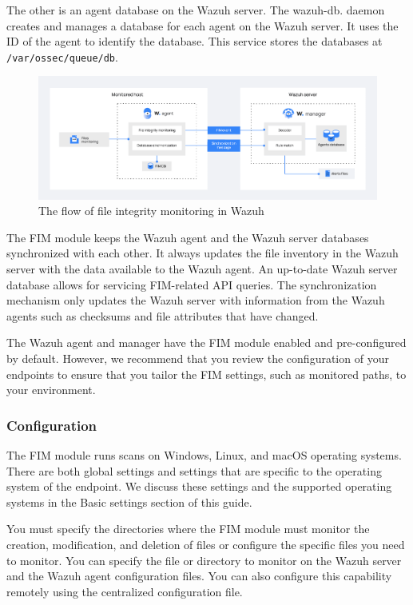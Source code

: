 The other is an agent database on the Wazuh server. The wazuh-db. daemon creates and manages a database for each agent on the Wazuh server. It uses the ID of the agent to identify the database. This service stores the databases at \texttt{/var/ossec/queue/db}.

\begin{figure} [H]
    \centering
    \includegraphics[width=\textwidth]{images/fim/fim-flow.png}
    \caption{The flow of file integrity monitoring in Wazuh}
    \label{fig:fim-flow}
\end{figure}

The FIM module keeps the Wazuh agent and the Wazuh server databases synchronized with each other. It always updates the file inventory in the Wazuh server with the data available to the Wazuh agent. An up-to-date Wazuh server database allows for servicing FIM-related API queries. The synchronization mechanism only updates the Wazuh server with information from the Wazuh agents such as checksums and file attributes that have changed.

The Wazuh agent and manager have the FIM module enabled and pre-configured by default. However, we recommend that you review the configuration of your endpoints to ensure that you tailor the FIM settings, such as monitored paths, to your environment.

\subsubsection{Configuration}
The FIM module runs scans on Windows, Linux, and macOS operating systems. There are both global settings and settings that are specific to the operating system of the endpoint. We discuss these settings and the supported operating systems in the Basic settings section of this guide.

You must specify the directories where the FIM module must monitor the creation, modification, and deletion of files or configure the specific files you need to monitor. You can specify the file or directory to monitor on the Wazuh server and the Wazuh agent configuration files. You can also configure this capability remotely using the centralized configuration file.

